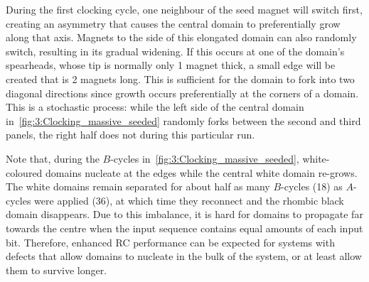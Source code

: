 \vspace{-1.5em}
\vspace{-1em}

During the first clocking cycle, one neighbour of the seed magnet will switch first, creating an asymmetry that causes the central domain to preferentially grow along that axis.
Magnets to the side of this elongated domain can also randomly switch, resulting in its gradual widening.
If this occurs at one of the domain's spearheads, whose tip is normally only 1 magnet thick, a small edge will be created that is 2 magnets long.
This is sufficient for the domain to fork into two diagonal directions since growth occurs preferentially at the corners of a domain.
This is a stochastic process: while the left side of the central domain in~\cref{fig:3:Clocking_massive_seeded} randomly forks between the second and third panels, the right half does not during this particular run. \par %
Note that, during the $B$-cycles in~\cref{fig:3:Clocking_massive_seeded}, white-coloured domains nucleate at the edges while the central white domain re-grows.
The white domains remain separated for about half as many $B$-cycles (18) as $A$-cycles were applied (36), at which time they reconnect and the rhombic black domain disappears.
Due to this imbalance, it is hard for domains to propagate far towards the centre when the input sequence contains equal amounts of each input bit.
Therefore, enhanced RC performance can be expected for systems with defects that allow domains to nucleate in the bulk of the system, or at least allow them to survive longer.

